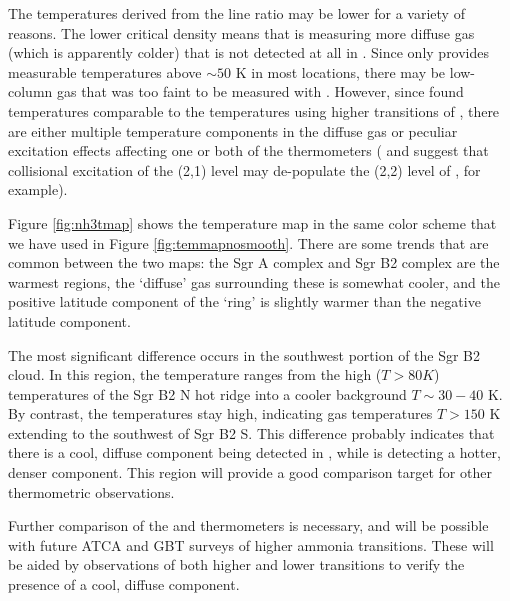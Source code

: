 The temperatures derived from the \ammonia line ratio may be lower for a
variety of reasons.  The lower critical density means that \ammonia is
measuring more diffuse gas (which is apparently colder) that is not detected at
all in \formaldehyde.  Since \formaldehyde only provides measurable
temperatures above $\sim50$ K in most locations, there may be low-column gas
that was too faint to be measured with \formaldehyde.  However, since
\citet{Guesten1981a} found temperatures comparable to the \formaldehyde
temperatures using higher transitions of \ammonia, there are either multiple
temperature components in the diffuse gas or peculiar excitation effects
affecting one or both of the thermometers (\citet{Guesten1981a} and
\citet{Morris1973a} suggest that collisional excitation of the (2,1) level may
de-populate the (2,2) level of \ammonia, for example).


Figure \ref{fig:nh3tmap} shows the \citet{Ott2014a} temperature map in the same
color scheme that we have used in Figure \ref{fig:temmapnosmooth}.  There are some
trends that are common between the two maps: the Sgr A complex and Sgr B2
complex are the warmest regions, the `diffuse' gas surrounding these is
somewhat cooler, and the positive latitude component of the
\citet{Molinari2011a} `ring' is slightly warmer than the negative latitude
component.

The most significant difference occurs in the southwest portion of the Sgr B2
cloud.  In this region, the \ammonia temperature ranges from the high ($T>80K$)
temperatures of the Sgr B2 N hot ridge into a cooler background $T\sim30-40$ K.
By contrast, the \formaldehyde temperatures stay high, indicating gas
temperatures $T>150$ K extending to the southwest of Sgr B2 S.  This difference
probably indicates that there is a cool, diffuse component being detected in
\ammonia, while \formaldehyde is detecting a hotter, denser component.  This
region will provide a good comparison target for other thermometric
observations.  

Further comparison of the \ammonia and \formaldehyde thermometers is necessary,
and will be possible with future ATCA and GBT surveys of higher ammonia
transitions.  These will be aided by observations of both higher and lower
\formaldehyde transitions \citep{Mangum1993a} to verify the presence of a cool,
diffuse component.

